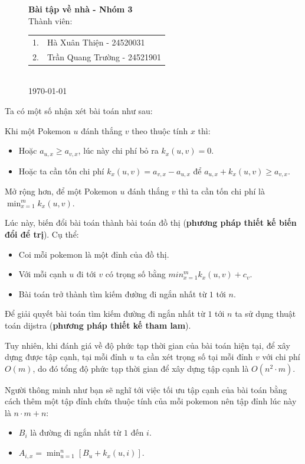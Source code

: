 \documentclass[12pt,a4paper]{article}
\begin{document}
	
	\begin{figure}
		\centering

		{\Large \textbf{Bài tập về nhà - Nhóm 3}}\\[1cm]
		{\large Thành viên:}\\[0.2cm]
		\begin{tabular}{ll}
			1. & Hà Xuân Thiện - 24520031 \\
			2. & Trần Quang Trường - 24521901 \\
		\end{tabular}\\[0.5cm]

		{\large \today}
	\end{figure}

Ta có một số nhận xét bài toán như sau:

Khi một Pokemon $u$ đánh thắng $v$ theo thuộc tính $x$ thì:
\begin{itemize}
	\item Hoặc $a_{u, x} \ge a_{v, x}$, lúc này chi phí bỏ ra $k_x(u, v) = 0$.
	\item Hoặc ta cần tốn chi phí $k_x(u, v) = a_{v, x} - a_{u, x}$ để $a_{u, x} + k_x(u, v) \ge a_{v, x}$.
\end{itemize}

Mở rộng hơn, để một Pokemon $u$ đánh thắng $v$ thì ta cần tốn chi phí là $\min_{x = 1}^m k_x(u, v)$.

Lúc này, biến đổi bài toán thành bài toán đồ thị (\textbf{phương pháp thiết kế biến đổi để trị}). Cụ thể:

\begin{itemize}
	\item Coi mỗi pokemon là một đỉnh của đồ thị.
	\item Với mỗi cạnh $u$ đi tới $v$ có trọng số bằng $min_{x=1}^m k_x(u, v) + c_v$.
	\item Bài toán trở thành tìm kiếm đường đi ngắn nhất từ $1$ tới $n$. 
\end{itemize}

Để giải quyết bài toán tìm kiếm đường đi ngắn nhất từ $1$ tới $n$ ta sử dụng thuật toán dijstra (\textbf{phương pháp thiết kế tham lam}).

Tuy nhiên, khi đánh giá về độ phức tạp thời gian của bài toán hiện tại, để xây dựng được tập cạnh, tại mỗi đỉnh $u$ ta cần xét trọng số tại mỗi đỉnh $v$ với chi phí $O(m)$, do đó tổng độ phức tạp thời gian để xây dựng tập cạnh là $O(n^2 \cdot m)$.

Người thông minh như bạn sẽ nghĩ tới việc tối ưu tập cạnh của bài toán bằng cách thêm một tập đỉnh chứa thuộc tính của mỗi pokemon nên tập đỉnh lúc này là $n \cdot m + n$:
\begin{itemize}
	\item $B_i$ là đường đi ngắn nhất từ $1$ đến $i$.
	\item $A_{i, x} = \min_{u=1}^n [B_u + k_{x}(u, i)]$.
\end{itemize}
\end{document}
